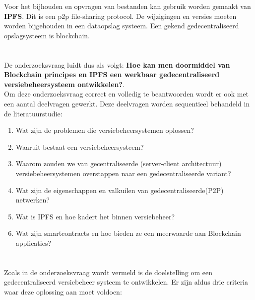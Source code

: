 Voor het bijhouden en opvragen van bestanden kan gebruik worden gemaakt van \textbf{IPFS}. Dit is een p2p file-sharing protocol. De wijzigingen en versies moeten worden bijgehouden in een dataopslag systeem. Een gekend gedecentraliseerd opslagsysteem is blockchain.


\section{}
\label{sec:onderzoeksvraag}
De onderzoeksvraag luidt dus als volgt: \textbf{Hoe kan men doormiddel van Blockchain principes en IPFS een werkbaar gedecentraliseerd versiebeheersysteem ontwikkelen?}.\\

Om deze onderzoeksvraag correct en volledig te beantwoorden wordt er ook met een aantal deelvragen gewerkt. Deze deelvragen worden sequentieel behandeld in de literatuurstudie:

\begin{enumerate}
\item Wat zijn de problemen die versiebeheersystemen oplossen? \\
\item Waaruit bestaat een versiebeheersysteem? \\
\item Waarom zouden we van gecentraliseerde (server-client architectuur) versiebeheersystemen overstappen naar een gedecentraliseerde variant?         \\
\item Wat zijn de eigenschappen en valkuilen van gedecentraliseerde(P2P) netwerken?\\
\item Wat is IPFS en hoe kadert het binnen versiebeheer?\\
\item Wat zijn smartcontracts en hoe bieden ze een meerwaarde aan Blockchain applicaties?\\
\end{enumerate}


\section{}
\label{sec:onderzoeksdoelstelling}

Zoals in de onderzoeksvraag wordt vermeld is de doelstelling om een gedecentraliseerd versiebeheer systeem te ontwikkelen. Er zijn aldus drie criteria waar deze oplossing aan moet voldoen:

